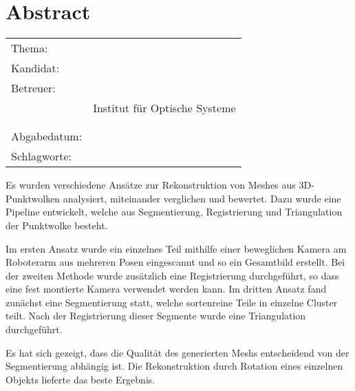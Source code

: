 \thispagestyle{plain}
\chapter*{Abstract}
\label{ch:abstract}


\begin{center}
	\begin{tabular}{p{3cm}p{10cm}}
		Thema: & \thema \\[1ex]
		Kandidat: & \autor \\[1ex]
		Betreuer: & \prueferA \\%
		 & Institut für Optische Systeme\\[1ex]
		 & \prueferB \\%
		 & \firma \\[1ex]
		Abgabedatum: & \abgabedatum \\[1ex]
		Schlagworte: & \schlagworte \\
	\end{tabular}
\end{center}


Es wurden verschiedene Ansätze zur Rekonstruktion von Meshes aus 3D-Punktwolken analysiert, miteinander verglichen und bewertet.
Dazu wurde eine Pipeline entwickelt, welche aus Segmentierung, Registrierung und Triangulation der Punktwolke besteht.

Im ersten Ansatz wurde ein einzelnes Teil mithilfe einer beweglichen Kamera am Roboterarm aus mehreren Posen eingescannt und so ein Gesamtbild erstellt.
Bei der zweiten Methode wurde zusätzlich eine Registrierung durchgeführt, so dass eine fest montierte Kamera verwendet werden kann.
Im dritten Ansatz fand zunächst eine Segmentierung statt, welche sortenreine Teile in einzelne Cluster teilt.
Nach der Registrierung dieser Segmente wurde eine Triangulation durchgeführt.

Es hat sich gezeigt, dass die Qualität des generierten Meshs entscheidend von der Segmentierung abhängig ist.
Die Rekonstruktion durch Rotation eines einzelnen Objekts lieferte das beste Ergebnis.


\newpage
